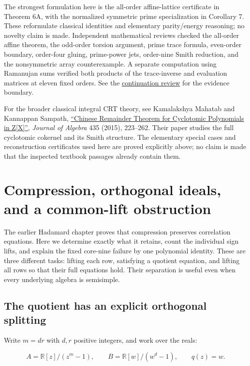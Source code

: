 \documentclass[
  11pt,
]{article}
\begin{document}
The strongest formulation here is the all-order affine-lattice
certificate in Theorem 6A, with the normalized symmetric prime
specialization in Corollary 7. These reformulate classical identities
and elementary parity/energy reasoning; no novelty claim is made.
Independent mathematical reviews checked the all-order affine theorem,
the odd-order torsion argument, prime trace formula, even-order
boundary, order-four gluing, prime-power jets, order-nine Smith
reduction, and the nonsymmetric array counterexample. A separate
computation using Ramanujan sums verified both products of the
trace-inverse and evaluation matrices at eleven fixed orders. See the
\href{PHASE2-REVIEW.md}{continuation review} for the evidence boundary.

For the broader classical integral CRT theory, see Kamalakshya Mahatab
and Kannappan Sampath, \href{https://arxiv.org/abs/1401.7696}{``Chinese
Remainder Theorem for Cyclotomic Polynomials in Z{[}X{]}''},
\emph{Journal of Algebra} 435 (2015), 223--262. Their paper studies the
full cyclotomic cokernel and its Smith structure. The elementary special
cases and reconstruction certificates used here are proved explicitly
above; no claim is made that the inspected textbook passages already
contain them.

\section{Compression, orthogonal ideals, and a common-lift
obstruction}\label{compression-orthogonal-ideals-and-a-common-lift-obstruction}

The earlier Hadamard chapter proves that compression preserves
correlation equations. Here we determine exactly what it retains, count
the individual sign lifts, and explain the fixed core-nine failure by
one polynomial identity. These are three different tasks: lifting each
row, satisfying a quotient equation, and lifting all rows so that their
full equations hold. Their separation is useful even when every
underlying algebra is semisimple.

\subsection{The quotient has an explicit orthogonal
splitting}\label{the-quotient-has-an-explicit-orthogonal-splitting}

Write \(m=dr\) with \(d,r\) positive integers, and work over the reals:

\[A=\mathbb R[z]/(z^m-1),\qquad
B=\mathbb R[w]/(w^d-1),\qquad q(z)=w.\]
\end{document}
